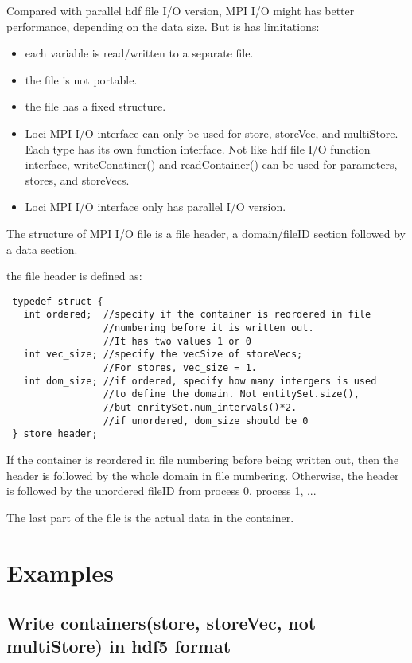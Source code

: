 \documentclass{article}
\begin{document}
 Compared with parallel hdf file I/O version,  MPI I/O might has
better performance, depending on the data size. But is has limitations: 

\begin{itemize} 
\item each variable is read/written to a separate file.
\item the file is not portable.
\item the file has a fixed structure.
\item Loci MPI I/O interface can only be used for store, storeVec, and multiStore. Each
  type has its own function interface. Not like hdf file I/O function
  interface, writeConatiner() and readContainer() can be used for
  parameters, stores, and storeVecs.    
\item Loci MPI I/O interface only has parallel I/O version. 
\end{itemize}

The structure of MPI I/O file is a file header, a domain/fileID section
followed by a data section.
 
the file header is defined as:

 \begin{lstlisting}
 typedef struct {
   int ordered;  //specify if the container is reordered in file
                 //numbering before it is written out.
                 //It has two values 1 or 0
   int vec_size; //specify the vecSize of storeVecs;
                 //For stores, vec_size = 1.  
   int dom_size; //if ordered, specify how many intergers is used
                 //to define the domain. Not entitySet.size(), 
                 //but enritySet.num_intervals()*2.  
                 //if unordered, dom_size should be 0
 } store_header;
\end{lstlisting}  

 If the container is reordered in file
numbering before being written out, then the header is followed by the whole domain
in file numbering. Otherwise, the header is followed by the unordered
fileID from process 0, process 1, ...

The last part of the file is the actual data in the container.    
\section {Examples }
\subsection {Write containers(store, storeVec, not multiStore) in hdf5 format }
\end{document}

